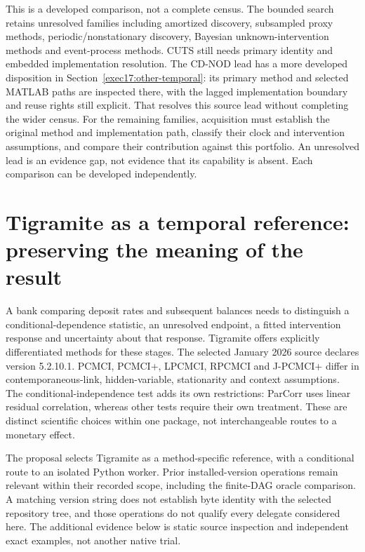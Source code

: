 This is a developed comparison, not a complete census. The bounded search
retains unresolved families including amortized discovery, subsampled
proxy methods, periodic/nonstationary discovery, Bayesian unknown-intervention
methods and event-process methods. CUTS still needs primary identity and
embedded implementation resolution. The CD-NOD lead has a more developed
disposition in Section~\ref{exec17:other-temporal}: its primary method and
selected MATLAB paths are inspected there, with the lagged implementation
boundary and reuse rights still explicit. That resolves this source lead
without completing the wider census. For the remaining families, acquisition
must establish the original method and implementation path, classify their
clock and intervention assumptions, and compare their contribution against
this portfolio. An unresolved lead is an evidence gap, not evidence that its
capability is absent. Each comparison can be developed independently.
\citep{exec14_pt_contract}
\label{exec14:python-temporal-end}


\section{Tigramite as a temporal reference: preserving the meaning of the result}
\label{exec23:tigramite-scope}
A bank comparing deposit rates and subsequent balances needs to distinguish a conditional-dependence statistic, an unresolved endpoint, a fitted intervention response and uncertainty about that response. Tigramite offers explicitly differentiated methods for these stages. The selected January 2026 source declares version 5.2.10.1. PCMCI, PCMCI+, LPCMCI, RPCMCI and J-PCMCI+ differ in contemporaneous-link, hidden-variable, stationarity and context assumptions. The conditional-independence test adds its own restrictions: ParCorr uses linear residual correlation, whereas other tests require their own treatment. These are distinct scientific choices within one package, not interchangeable routes to a monetary effect. \citep{exec23_tigramite_reuse_source,exec14_pt_tigramite}

The proposal selects Tigramite as a method-specific reference, with a conditional route to an isolated Python worker. Prior installed-version operations remain relevant within their recorded scope, including the finite-DAG oracle comparison. A matching version string does not establish byte identity with the selected repository tree, and those operations do not qualify every delegate considered here. \citep{runtime_tigramite_scope,runtime_networkx_dynamic} The additional evidence below is static source inspection and independent exact examples, not another native trial.

